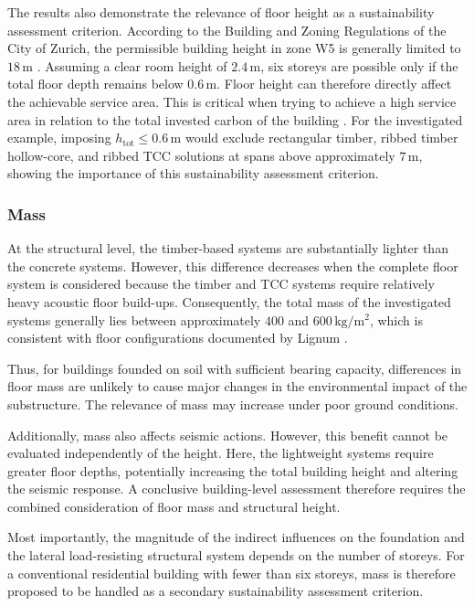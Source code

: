The results also demonstrate the relevance of floor height as a sustainability assessment criterion. According to the Building and Zoning Regulations of the City of Zurich, the permissible building height in zone W5 is generally limited to \(18\,\mathrm{m}\) \cite{StadtZuerich_Bauordnung_700100}. Assuming a clear room height of \(2.4\,\mathrm{m}\), six storeys are possible only if the total floor depth remains below \(0.6\,\mathrm{m}\). Floor height can therefore directly affect the achievable service area. This is critical when trying to achieve a high service area in relation to the total invested carbon of the building \cite{Kaufmann2024_WhitePaper}. For the investigated example, imposing \(h_{\mathrm{tot}}\leq 0.6\,\mathrm{m}\) would exclude rectangular timber, ribbed timber hollow-core, and ribbed TCC solutions at spans above approximately \(7\,\mathrm{m}\), showing the importance of this sustainability assessment criterion.

\subsubsection{Mass}
At the structural level, the timber-based systems are substantially lighter than the concrete systems. However, this difference decreases when the complete floor system is considered because the timber and TCC systems require relatively heavy acoustic floor build-ups. Consequently, the total mass of the investigated systems generally lies between approximately \(400\) and \(600\,\mathrm{kg/m^2}\), which is consistent with floor configurations documented by Lignum \cite{Lignum2021_HBT1}.

Thus, for buildings founded on soil with sufficient bearing capacity, differences in floor mass are unlikely to cause major changes in the environmental impact of the substructure. The relevance of mass may increase under poor ground conditions.

Additionally, mass also affects seismic actions. However, this benefit cannot be evaluated independently of the height. Here, the lightweight systems require greater floor depths, potentially increasing the total building height and altering the seismic response. A conclusive building-level assessment therefore requires the combined consideration of floor mass and structural height. 

Most importantly, the magnitude of the indirect influences on the foundation and the lateral load-resisting structural system depends on the number of storeys. For a conventional residential building with fewer than six storeys, mass is therefore proposed to be handled as a secondary sustainability assessment criterion.

